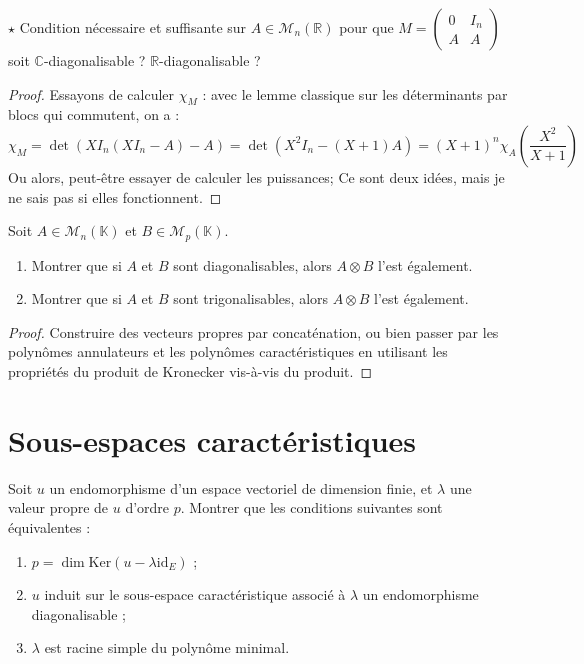 \documentclass[french,a4paper]{article}
\newcommand{\R}{\mathbb{R}}
\newcommand{\C}{\mathbb{C}}
\newcommand{\K}{\mathbb{K}}
\renewcommand{\ker}{\text{Ker}}
\theoremstyle{plain}
\theoremstyle{definition}
\theoremstyle{remark}
\begin{document}
\begin{ex}{$\star$}
	Condition nécessaire et suffisante sur $A\in\mathcal{M}_n(\R)$ pour que $\displaystyle M=\begin{pmatrix}
		0&I_n\\
		A&A
	\end{pmatrix}$ soit $\C$-diagonalisable ? $\R$-diagonalisable ?
\end{ex}
\begin{proof}
	Essayons de calculer $\chi_M$ : avec le lemme classique sur les déterminants par blocs qui commutent, on a : $$\chi_M=\det(XI_n(XI_n-A)-A)=\det(X^2I_n-(X+1)A)=(X+1)^n\chi_A\left(\frac{X^2}{X+1}\right)$$ Ou alors, peut-être essayer de calculer les puissances; Ce sont deux idées, mais je ne sais pas si elles fonctionnent.
\end{proof}

\begin{ex}{}
	Soit $A\in\mathcal{M}_n(\K)$ et $B\in\mathcal{M}_p(\K)$. 
	\begin{enumerate}
		\item Montrer que si $A$ et $B$ sont diagonalisables, alors $A\otimes B$ l'est également.
		\item Montrer que si $A$ et $B$ sont trigonalisables, alors $A\otimes B$ l'est également.
	\end{enumerate}
\end{ex}
\begin{proof}
	Construire des vecteurs propres par concaténation, ou bien passer par les polynômes annulateurs et les polynômes caractéristiques en utilisant les propriétés du produit de Kronecker vis-à-vis du produit.
\end{proof}

\section{Sous-espaces caractéristiques}

\begin{ex}{}
	Soit $u$ un endomorphisme d'un espace vectoriel de dimension finie, et $\lambda$ une valeur propre de $u$ d'ordre $p$. Montrer que les conditions suivantes sont équivalentes :
	\begin{enumerate}[label=(\roman*)]
		\item $p=\dim\ker(u-\lambda\text{id}_E)$ ;
		\item $u$ induit sur le sous-espace caractéristique associé à $\lambda$ un endomorphisme diagonalisable ;
		\item $\lambda$ est racine simple du polynôme minimal.
	\end{enumerate}
\end{ex}
\end{document}
